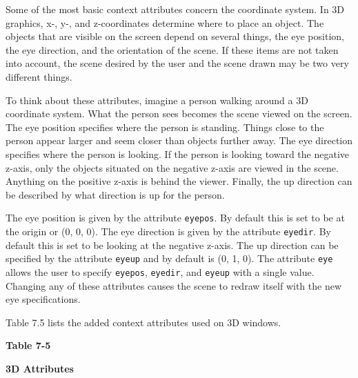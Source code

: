 Some of the most basic context attributes concern the coordinate
system.  In 3D graphics, x-, y-, and z-coordinates determine where to
place an object. The objects that are visible on the screen depend on
several things, the eye position, the eye direction, and the
orientation of the scene. If these items are not taken into account,
the scene desired by the user and the scene drawn may be two very
different things.

To think about these attributes, imagine a person walking around a 3D
coordinate system. What the person sees becomes the scene viewed on
the screen. The eye position specifies where the person is
standing. Things close to the person appear larger and seem closer
than objects further away. The eye direction specifies where the
person is looking. If the person is looking toward the negative
z-axis, only the objects situated on the negative z-axis are viewed in
the scene. Anything on the positive z-axis is behind the
viewer. Finally, the up direction can be described by what direction
is up for the person.

The eye position is given by the attribute \texttt{eyepos}. By default this is
set to be at the origin or (0, 0, 0). The eye direction is given by
the attribute \texttt{eyedir}. By default this is set to be looking at the
negative z-axis. The up direction can be specified by the attribute
\texttt{eyeup} and by default is (0, 1, 0). The attribute \texttt{eye} allows the user
to specify \texttt{eyepos}, \texttt{eyedir}, and \texttt{eyeup} with a single value. Changing any
of these attributes causes the scene to redraw itself with the new eye
specifications.

Table 7.5 lists the added context attributes used on 3D windows.

{\centering\sffamily\bfseries
Table 7-5
\par}

{\centering\sffamily\bfseries
3D Attributes
\par}

